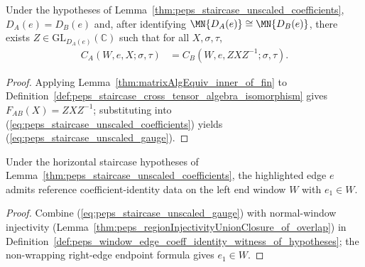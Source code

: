\begin{lemma}%
    \label{thm:peps_staircase_unscaled_gauge}
    \leanok
    Under the hypotheses of Lemma~\ref{thm:peps_staircase_unscaled_coefficients},
    $D_A(e)=D_B(e)$ and, after identifying $\MN{D_A(e)}\cong\MN{D_B(e)}$, there
    exists $Z\in\mathrm{GL}_{D_A(e)}(\mathbb C)$ such that for all $X,\sigma,\tau$,
    \begin{align}
        C_A(W,e,X;\sigma,\tau)
         & =C_B(W,e,ZXZ^{-1};\sigma,\tau).
        \label{eq:peps_staircase_unscaled_gauge}
    \end{align}
\end{lemma}
\begin{proof}
    \leanok
    Applying Lemma~\ref{thm:matrixAlgEquiv_inner_of_fin} to
    Definition~\ref{def:peps_staircase_cross_tensor_algebra_isomorphism} gives
    $F_{AB}(X)=ZXZ^{-1}$; substituting into
    (\ref{eq:peps_staircase_unscaled_coefficients}) yields
    (\ref{eq:peps_staircase_unscaled_gauge}).
\end{proof}

\begin{lemma}%
    \label{thm:peps_horizontal_arc_window_witness}
    \leanok
    Under the horizontal staircase hypotheses of
    Lemma~\ref{thm:peps_staircase_unscaled_coefficients}, the highlighted edge
    $e$ admits reference coefficient-identity data on the left end window $W$
    with $e_1\in W$.
\end{lemma}
\begin{proof}
    \leanok
    Combine (\ref{eq:peps_staircase_unscaled_gauge}) with normal-window
    injectivity (Lemma~\ref{thm:peps_regionInjectivityUnionClosure_of_overlap})
    in Definition~\ref{def:peps_window_edge_coeff_identity_witness_of_hypotheses};
    the non-wrapping right-edge endpoint formula gives $e_1\in W$.
\end{proof}

